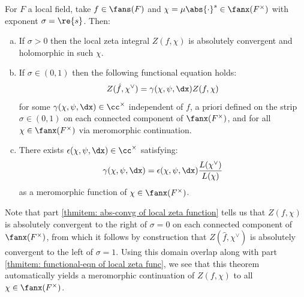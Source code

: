 \documentclass[11pt, x11names, openany]{book}
\begin{document}
\begin{theorem}
\label{thm: local zeta function convergence and func-eqn}
    For $F$ a local field, take  $f \in \fans(F)$ and $\chi = \mu \abs{\cdot}^s \in \fanx(F^\times)$ with exponent $\sigma = \re{s}$. Then:
    \begin{enumerate}[(a)]
        \item \label{thmitem: abs-convg of local zeta function} If $\sigma > 0$ then the local zeta integral $Z(f, \chi)$ is absolutely convergent and holomorphic in such $\chi$.
        \item \label{thmitem: functional-eqn of local zeta func} If $\sigma \in (0, 1)$ then the following functional equation holds:
        \begin{equation*}
            Z(\hat{f}, \chi^\lor) = \gamma(\chi, \psi, \dx) Z(f, \chi)
        \end{equation*}
        for some $\gamma(\chi, \psi, \dx) \in \cc^\times$ independent of $f$, a priori defined on the strip $\sigma \in (0, 1)$ on each connected component of $\fanx(F^\times)$, and for all $\chi \in \fanx(F^\times)$ via meromorphic continuation.
        \item \label{thmitem: epsilon factor local-zeta-func} There exists $\epsilon(\chi, \psi, \dx) \in \cc^\times$ satisfying:
        \begin{equation*}
            \gamma(\chi, \psi, \dx ) = \epsilon(\chi, \psi, \dx) \frac{L(\chi^\lor)}{L(\chi)}
        \end{equation*}
        as a meromorphic function of $\chi \in \fanx(F^\times)$.
    \end{enumerate} 
\end{theorem}

\begin{observation}
Note that part \ref{thmitem: abs-convg of local zeta function} tells us that $Z(f, \chi)$ is absolutely convergent to the right of $\sigma = 0$ on each connected component of $\fanx(F^\times)$, from which it follows by construction that $Z(\hat{f}, \chi^\lor)$ is absolutely convergent to the left of $\sigma = 1$. Using this domain overlap along with part \ref{thmitem: functional-eqn of local zeta func}, we see that this theorem automatically yields a meromorphic continuation of $Z(f, \chi)$ to all $\chi \in \fanx(F^\times)$.
\end{observation}
\end{document}

